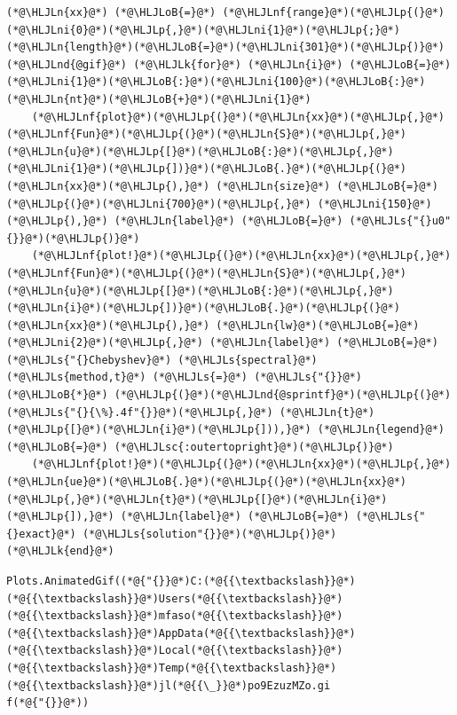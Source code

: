 \documentclass[12pt,a4paper]{article}
\newcommand{\HLJLk}[1]{\textcolor[RGB]{148,91,176}{\textbf{#1}}}
\newcommand{\HLJLn}[1]{#1}
\newcommand{\HLJLnd}[1]{\textcolor[RGB]{214,102,97}{#1}}
\newcommand{\HLJLnf}[1]{\textcolor[RGB]{66,102,213}{#1}}
\newcommand{\HLJLs}[1]{\textcolor[RGB]{201,61,57}{#1}}
\newcommand{\HLJLsc}[1]{\textcolor[RGB]{201,61,57}{#1}}
\newcommand{\HLJLni}[1]{\textcolor[RGB]{59,151,46}{#1}}
\newcommand{\HLJLoB}[1]{\textcolor[RGB]{102,102,102}{\textbf{#1}}}
\newcommand{\HLJLp}[1]{#1}
\begin{document}
\begin{lstlisting}
(*@\HLJLn{xx}@*) (*@\HLJLoB{=}@*) (*@\HLJLnf{range}@*)(*@\HLJLp{(}@*)(*@\HLJLni{0}@*)(*@\HLJLp{,}@*)(*@\HLJLni{1}@*)(*@\HLJLp{;}@*)(*@\HLJLn{length}@*)(*@\HLJLoB{=}@*)(*@\HLJLni{301}@*)(*@\HLJLp{)}@*)
(*@\HLJLnd{@gif}@*) (*@\HLJLk{for}@*) (*@\HLJLn{i}@*) (*@\HLJLoB{=}@*) (*@\HLJLni{1}@*)(*@\HLJLoB{:}@*)(*@\HLJLni{100}@*)(*@\HLJLoB{:}@*)(*@\HLJLn{nt}@*)(*@\HLJLoB{+}@*)(*@\HLJLni{1}@*)
    (*@\HLJLnf{plot}@*)(*@\HLJLp{(}@*)(*@\HLJLn{xx}@*)(*@\HLJLp{,}@*) (*@\HLJLnf{Fun}@*)(*@\HLJLp{(}@*)(*@\HLJLn{S}@*)(*@\HLJLp{,}@*)(*@\HLJLn{u}@*)(*@\HLJLp{[}@*)(*@\HLJLoB{:}@*)(*@\HLJLp{,}@*)(*@\HLJLni{1}@*)(*@\HLJLp{])}@*)(*@\HLJLoB{.}@*)(*@\HLJLp{(}@*)(*@\HLJLn{xx}@*)(*@\HLJLp{),}@*) (*@\HLJLn{size}@*) (*@\HLJLoB{=}@*) (*@\HLJLp{(}@*)(*@\HLJLni{700}@*)(*@\HLJLp{,}@*) (*@\HLJLni{150}@*)(*@\HLJLp{),}@*) (*@\HLJLn{label}@*) (*@\HLJLoB{=}@*) (*@\HLJLs{"{}u0"{}}@*)(*@\HLJLp{)}@*)
    (*@\HLJLnf{plot!}@*)(*@\HLJLp{(}@*)(*@\HLJLn{xx}@*)(*@\HLJLp{,}@*) (*@\HLJLnf{Fun}@*)(*@\HLJLp{(}@*)(*@\HLJLn{S}@*)(*@\HLJLp{,}@*)(*@\HLJLn{u}@*)(*@\HLJLp{[}@*)(*@\HLJLoB{:}@*)(*@\HLJLp{,}@*)(*@\HLJLn{i}@*)(*@\HLJLp{])}@*)(*@\HLJLoB{.}@*)(*@\HLJLp{(}@*)(*@\HLJLn{xx}@*)(*@\HLJLp{),}@*) (*@\HLJLn{lw}@*)(*@\HLJLoB{=}@*)(*@\HLJLni{2}@*)(*@\HLJLp{,}@*) (*@\HLJLn{label}@*) (*@\HLJLoB{=}@*) (*@\HLJLs{"{}Chebyshev}@*) (*@\HLJLs{spectral}@*) (*@\HLJLs{method,t}@*) (*@\HLJLs{=}@*) (*@\HLJLs{"{}}@*) (*@\HLJLoB{*}@*) (*@\HLJLp{(}@*)(*@\HLJLnd{@sprintf}@*)(*@\HLJLp{(}@*)(*@\HLJLs{"{}{\%}.4f"{}}@*)(*@\HLJLp{,}@*) (*@\HLJLn{t}@*)(*@\HLJLp{[}@*)(*@\HLJLn{i}@*)(*@\HLJLp{])),}@*) (*@\HLJLn{legend}@*) (*@\HLJLoB{=}@*) (*@\HLJLsc{:outertopright}@*)(*@\HLJLp{)}@*)
    (*@\HLJLnf{plot!}@*)(*@\HLJLp{(}@*)(*@\HLJLn{xx}@*)(*@\HLJLp{,}@*) (*@\HLJLn{ue}@*)(*@\HLJLoB{.}@*)(*@\HLJLp{(}@*)(*@\HLJLn{xx}@*)(*@\HLJLp{,}@*)(*@\HLJLn{t}@*)(*@\HLJLp{[}@*)(*@\HLJLn{i}@*)(*@\HLJLp{]),}@*) (*@\HLJLn{label}@*) (*@\HLJLoB{=}@*) (*@\HLJLs{"{}exact}@*) (*@\HLJLs{solution"{}}@*)(*@\HLJLp{)}@*)
(*@\HLJLk{end}@*)
\end{lstlisting}

\begin{lstlisting}
Plots.AnimatedGif((*@{"{}}@*)C:(*@{{\textbackslash}}@*)(*@{{\textbackslash}}@*)Users(*@{{\textbackslash}}@*)(*@{{\textbackslash}}@*)mfaso(*@{{\textbackslash}}@*)(*@{{\textbackslash}}@*)AppData(*@{{\textbackslash}}@*)(*@{{\textbackslash}}@*)Local(*@{{\textbackslash}}@*)(*@{{\textbackslash}}@*)Temp(*@{{\textbackslash}}@*)(*@{{\textbackslash}}@*)jl(*@{{\_}}@*)po9EzuzMZo.gi
f(*@{"{}}@*))
\end{lstlisting}
\end{document}
